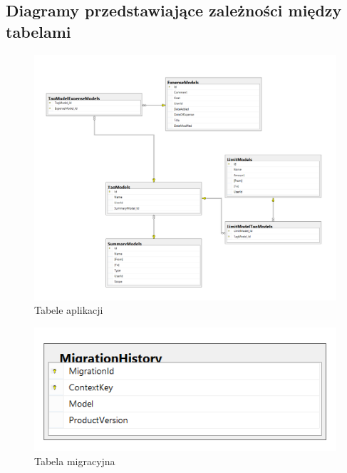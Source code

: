 \documentclass[10pt,titlepage]{article}
\begin{document}
\subsection{Diagramy przedstawiające zależności między tabelami}
\begin{figure}[htbp]
  \centering
  \includegraphics[scale=0.5]{images/db1.png}
  \caption{Tabele aplikacji}
\end{figure}
\begin{figure}[htbp]
  \centering
  \includegraphics[scale=0.5]{images/db2.png}
  \caption{Tabela migracyjna}
\end{figure}
\end{document}
